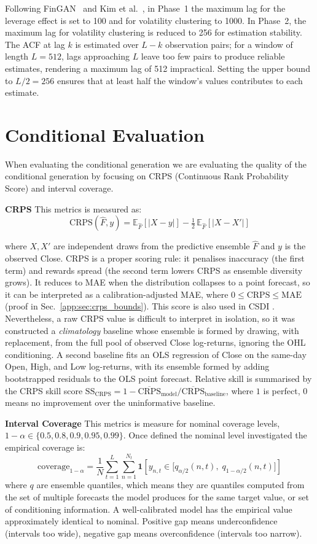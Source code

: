Following FinGAN\ \cite{stakahashy_fingan} and Kim et al.\ \cite{kim2025diffusion}, in Phase~1 the maximum lag for the leverage effect is set to 100 and for volatility clustering to 1000. In Phase~2, the maximum lag for volatility clustering is reduced to 256 for estimation stability. The ACF at lag \(k\) is estimated over \(L - k\) observation pairs; for a window of length \(L = 512\), lags approaching \(L\) leave too few pairs to produce reliable estimates, rendering a maximum lag of 512 impractical. Setting the upper bound to \(L/2 = 256\) ensures that at least half the window's values contributes to each estimate.


\section{Conditional Evaluation}
When evaluating the conditional generation we are evaluating the quality of the conditional generation by focusing on CRPS (Continuous Rank Probability Score) and interval coverage.

\textbf{CRPS} \quad This metrics is measured as:
\[
\text{CRPS}(\hat{F}, y) = \mathbb{E}_{\hat{F}} \left[|X - y|\right] - \tfrac{1}{2}\,\mathbb{E}_{\hat{F}}\left[|X - X'|\right]
\]

where \(X,X'\) are independent draws from the predictive ensemble \(\hat{F}\) and \(y\) is the observed Close. CRPS \cite{matheson1976scoring} is a proper scoring rule: it penalises inaccuracy 
(the first term) and rewards spread (the second term lowers CRPS as ensemble 
diversity grows). It reduces to MAE when the distribution collapses to a point forecast, so it can be interpreted as a calibration-adjusted MAE, where \(0 \le \text{CRPS}\le\text{MAE}\) (proof in Sec.\ \ref{app:sec:crps_bounds}). This score is also used in CSDI \cite{tashiro2021csdi}. Nevertheless, a raw CRPS value is difficult to interpret in isolation, so it was constructed a \emph{climatology} baseline whose ensemble is formed by drawing, with replacement, from the full pool of observed Close log-returns, ignoring the OHL conditioning. A second baseline fits an OLS regression of Close on the same-day Open, High, and Low log-returns, with its ensemble formed by adding bootstrapped residuals to the OLS point forecast. Relative skill is summarised by the CRPS skill score $\text{SS}_{\text{CRPS}} = 1 - \overline{\text{CRPS}}_{\text{model}} / \overline{\text{CRPS}}_{\text{baseline}}$, where $1$ is perfect, $0$ means no improvement over the uninformative baseline.

\textbf{Interval Coverage} \quad This metrics is measure for nominal coverage levels, \(1-\alpha \in \{0.5,0.8,0.9,0.95,0.99\}\). Once defined the nominal level investigated the empirical coverage is:
\[
\text{coverage}_{1-\alpha} = \frac{1}{N} \sum_{t=1}^{L} \sum_{n=1}^{N_t} \mathbf{1}\left[y_{n,t} \in \bigl[q_{\alpha/2}(n,t),\; q_{1-\alpha/2}(n,t)\bigr]\right]
\]
where \(q\) are ensemble quantiles, which means they are quantiles computed from the set of multiple forecasts the model produces for the same target value, or set of conditioning information. A well-calibrated model has the empirical value approximately identical to nominal. Positive gap means underconfidence (intervals too wide), negative gap means overconfidence (intervals too narrow).

